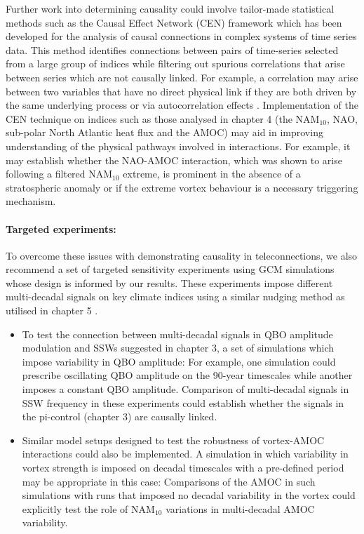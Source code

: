 Further work into determining causality could involve tailor-made statistical methods such as the Causal Effect Network (CEN) framework \citep{Kretschmer2016} which has been developed for the analysis of causal connections in complex systems of time series data. This method identifies connections between pairs of time-series selected from a large group of indices while filtering out spurious correlations that arise between series which are not causally linked. For example, a correlation may arise between two variables that have no direct physical link if they are both driven by the same underlying process or via autocorrelation effects \citep{rungeQuantifying2014}. Implementation of the CEN technique on indices such as those analysed in chapter 4 (the NAM$_{10}$, NAO, sub-polar North Atlantic heat flux and the AMOC) may aid in improving understanding of the physical pathways involved in interactions. For example, it may establish whether the NAO-AMOC interaction, which was shown to arise following a filtered NAM$_{10}$ extreme, is prominent in the absence of a stratospheric anomaly or if the extreme vortex behaviour is a necessary triggering mechanism. 

\paragraph{Targeted experiments:}
To overcome these issues with demonstrating causality in teleconnections, we also recommend a set of targeted sensitivity experiments using GCM simulations whose design is informed by our results. These experiments impose different multi-decadal signals on key climate indices using a similar nudging method as utilised in chapter 5 \citep{telfordTechnical2008}.

\begin{itemize}
    \item To test the connection between multi-decadal signals in QBO amplitude modulation and SSWs suggested in chapter 3, a set of simulations which impose variability in QBO amplitude: For example, one simulation could prescribe oscillating QBO amplitude on the 90-year timescales while another imposes a constant QBO amplitude. Comparison of multi-decadal signals in SSW frequency in these experiments could establish whether the signals in the pi-control (chapter 3) are causally linked.  
    
    \item Similar model setups designed to test the robustness of vortex-AMOC interactions could also be implemented. A simulation in which variability in vortex strength is imposed on decadal timescales with a pre-defined period may be appropriate in this case: Comparisons of the AMOC in such simulations with runs that imposed no decadal variability in the vortex could explicitly test the role of NAM$_{10}$ variations in multi-decadal AMOC variability. 
    
\end{itemize}

